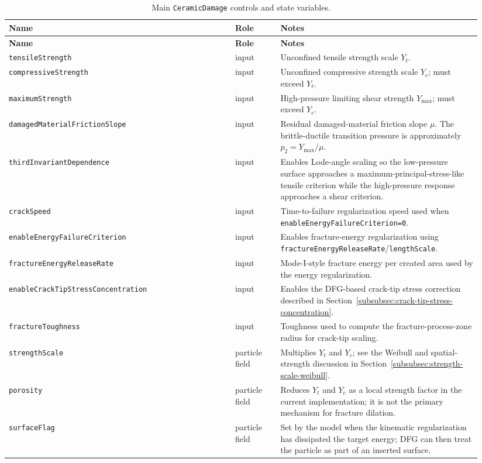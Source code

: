 \begingroup\scriptsize
\setlength{\tabcolsep}{2.5pt}
\begin{longtable}{@{}p{0.45\linewidth}p{0.09\linewidth}p{0.40\linewidth}@{}}
\caption{Main \texttt{CeramicDamage} controls and state variables.\label{tab:ceramic-damage-controls}}\\
\toprule
\textbf{Name} & \textbf{Role} & \textbf{Notes}\\
\midrule
\endfirsthead
\toprule
\textbf{Name} & \textbf{Role} & \textbf{Notes}\\
\midrule
\endhead
\texttt{tensileStrength} & input & Unconfined tensile strength scale \(Y_t\).\\
\texttt{compressiveStrength} & input & Unconfined compressive strength scale \(Y_c\); must exceed \(Y_t\).\\
\texttt{maximumStrength} & input & High-pressure limiting shear strength \(Y_{\max}\); must exceed \(Y_c\).\\
\texttt{damagedMaterialFrictionSlope} & input & Residual damaged-material friction slope \(\mu\).  The brittle-ductile transition pressure is approximately \(p_2=Y_{\max}/\mu\).\\
\texttt{thirdInvariantDependence} & input & Enables Lode-angle scaling so the low-pressure surface approaches a maximum-principal-stress-like tensile criterion while the high-pressure response approaches a shear criterion.\\
\texttt{crackSpeed} & input & Time-to-failure regularization speed used when \texttt{enableEnergyFailureCriterion=0}.\\
\texttt{enableEnergyFailureCriterion} & input & Enables fracture-energy regularization using \texttt{fractureEnergyReleaseRate}/\texttt{lengthScale}.\\
\texttt{fractureEnergyReleaseRate} & input & Mode-I-style fracture energy per created area used by the energy regularization.\\
\texttt{enableCrackTipStressConcentration} & input & Enables the DFG-based crack-tip stress correction described in Section~\ref{subsubsec:crack-tip-stress-concentration}.\\
\texttt{fractureToughness} & input & Toughness used to compute the fracture-process-zone radius for crack-tip scaling.\\
\texttt{strengthScale} & particle field & Multiplies \(Y_t\) and \(Y_c\); see the Weibull and spatial-strength discussion in Section~\ref{subsubsec:strength-scale-weibull}.\\
\texttt{porosity} & particle field & Reduces \(Y_t\) and \(Y_c\) as a local strength factor in the current implementation; it is not the primary mechanism for fracture dilation.\\
\texttt{surfaceFlag} & particle field & Set by the model when the kinematic regularization has dissipated the target energy; DFG can then treat the particle as part of an inserted surface.\\
\bottomrule
\end{longtable}
\endgroup

